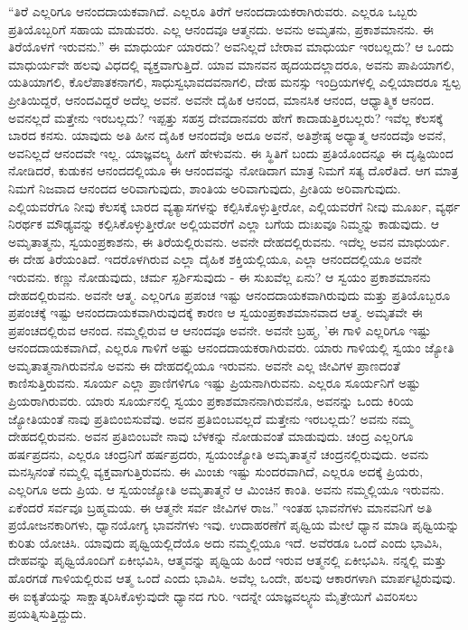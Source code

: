 “ತಿರೆ ಎಲ್ಲರಿಗೂ ಆನಂದದಾಯಕವಾಗಿದೆ. ಎಲ್ಲರೂ ತಿರೆಗೆ ಆನಂದದಾಯಕರಾಗಿರುವರು. ಎಲ್ಲರೂ ಒಬ್ಬರು ಪ್ರತಿಯೊಬ್ಬರಿಗೆ ಸಹಾಯ ಮಾಡುವರು. ಎಲ್ಲ ಆನಂದವೂ ಆತ್ಮನದು. ಅವನು ಅಮೃತನು, ಪ್ರಕಾಶಮಾನನು. ಈ ತಿರೆಯೊಳಗೆ ಇರುವನು.” ಈ ಮಾಧುರ್ಯ ಯಾರದು? ಅವನಿಲ್ಲದೆ ಬೇರಾವ ಮಾಧುರ್ಯ ಇರಬಲ್ಲದು? ಆ ಒಂದು ಮಾಧುರ್ಯವೇ ಹಲವು ವಿಧದಲ್ಲಿ ವ್ಯಕ್ತವಾಗುತ್ತಿದೆ. ಯಾವ ಮಾನವನ ಹೃದಯದಲ್ಲಾದರೂ, ಅವನು ಪಾಪಿಯಾಗಲಿ, ಯತಿಯಾಗಲಿ, ಕೊಲೆಪಾತಕನಾಗಲಿ, ಸಾಧುಸ್ವಭಾವದವನಾಗಲಿ, ದೇಹ ಮನಸ್ಸು ಇಂದ್ರಿಯಗಳಲ್ಲಿ ಎಲ್ಲಿಯಾದರೂ ಸ್ವಲ್ಪ ಪ್ರೀತಿಯಿದ್ದರೆ, ಆನಂದವಿದ್ದರೆ ಅದೆಲ್ಲ ಅವನೆ. ಅವನೇ ದೈಹಿಕ ಆನಂದ, ಮಾನಸಿಕ ಆನಂದ, ಆಧ್ಯಾತ್ಮಿಕ ಆನಂದ. ಅವನಲ್ಲದೆ ಮತ್ತೇನು ಇರಬಲ್ಲದು? ಇಪ್ಪತ್ತು ಸಹಸ್ರ ದೇವದಾನವರು ಹೇಗೆ ಕಾದಾಡುತ್ತಿರಬಲ್ಲರು? ಇವೆಲ್ಲ ಕೆಲಸಕ್ಕೆ ಬಾರದ ಕನಸು. ಯಾವುದು ಅತಿ ಹೀನ ದೈಹಿಕ ಆನಂದವೊ ಅದೂ ಅವನೆ, ಅತಿಶ್ರೇಷ್ಠ ಅಧ್ಯಾತ್ಮ ಆನಂದವೊ ಅವನೆ, ಅವನಿಲ್ಲದೆ ಆನಂದವೇ ಇಲ್ಲ. ಯಾಜ್ಞವಲ್ಕ್ಯ ಹೀಗೆ ಹೇಳುವನು. ಈ ಸ್ಥಿತಿಗೆ ಬಂದು ಪ್ರತಿಯೊಂದನ್ನೂ ಈ ದೃಷ್ಟಿಯಿಂದ ನೋಡಿದರೆ, ಕುಡುಕನ ಆನಂದದಲ್ಲಿಯೂ ಈ ಆನಂದವನ್ನು ನೋಡಿದಾಗ ಮಾತ್ರ ನಿಮಗೆ ಸತ್ಯ ದೊರೆತಿದೆ. ಆಗ ಮಾತ್ರ ನಿಮಗೆ ನಿಜವಾದ ಆನಂದದ ಅರಿವಾಗುವುದು, ಶಾಂತಿಯ ಅರಿವಾಗುವುದು, ಪ್ರೀತಿಯ ಅರಿವಾಗುವುದು. ಎಲ್ಲಿಯವರೆಗೂ ನೀವು ಕೆಲಸಕ್ಕೆ ಬಾರದ ವ್ಯತ್ಯಾಸಗಳನ್ನು ಕಲ್ಪಿಸಿಕೊಳ್ಳುತ್ತೀರೋ, ಎಲ್ಲಿಯವರೆಗೆ ನೀವು ಮೂರ್ಖ, ವ್ಯರ್ಥ ನಿರರ್ಥಕ ಮೌಢ್ಯವನ್ನು ಕಲ್ಪಿಸಿಕೊಳ್ಳುತ್ತೀರೋ ಅಲ್ಲಿಯವರೆಗೆ ಎಲ್ಲಾ ಬಗೆಯ ದುಃಖವೂ ನಿಮ್ಮನ್ನು ಕಾಡುವುದು. ಆ ಅಮೃತಾತ್ಮನು, ಸ್ವಯಂಪ್ರಕಾಶನು, ಈ ತಿರೆಯಲ್ಲಿರುವನು. ಅವನೇ ದೇಹದಲ್ಲಿರುವನು. ಇದೆಲ್ಲ ಅವನ ಮಾಧುರ್ಯ. ಈ ದೇಹ ತಿರೆಯಂತಿದೆ. ಇದರೊಳಗಿರುವ ಎಲ್ಲಾ ದೈಹಿಕ ಶಕ್ತಿಯಲ್ಲಿಯೂ, ಎಲ್ಲಾ ಆನಂದದಲ್ಲಿಯೂ ಅವನೇ ಇರುವನು. ಕಣ್ಣು ನೋಡುವುದು, ಚರ್ಮ ಸ್ಪರ್ಶಿಸುವುದು - ಈ ಸುಖವೆಲ್ಲ ಏನು? ಆ ಸ್ವಯಂ ಪ್ರಕಾಶಮಾನನು ದೇಹದಲ್ಲಿರುವನು. ಅವನೇ ಆತ್ಮ. ಎಲ್ಲರಿಗೂ ಪ್ರಪಂಚ ಇಷ್ಟು ಆನಂದದಾಯಕವಾಗಿರುವುದು ಮತ್ತು ಪ್ರತಿಯೊಬ್ಬರೂ ಪ್ರಪಂಚಕ್ಕೆ ಇಷ್ಟು ಆನಂದದಾಯಕವಾಗಿರುವುದಕ್ಕೆ ಕಾರಣ ಆ ಸ್ವಯಂಪ್ರಕಾಶಮಾನವಾದ ಆತ್ಮ. ಅಮೃತವೇ ಈ ಪ್ರಪಂಚದಲ್ಲಿರುವ ಆನಂದ. ನಮ್ಮಲ್ಲಿರುವ ಆ ಆನಂದವೂ ಅವನೇ. ಅವನೇ ಬ್ರಹ್ಮ, 'ಈ ಗಾಳಿ ಎಲ್ಲರಿಗೂ ಇಷ್ಟು ಆನಂದದಾಯಕವಾಗಿದೆ, ಎಲ್ಲರೂ ಗಾಳಿಗೆ ಅಷ್ಟು ಆನಂದದಾಯಕರಾಗಿರುವರು. ಯಾರು ಗಾಳಿಯಲ್ಲಿ ಸ್ವಯಂ ಜ್ಯೋತಿ ಅಮೃತಾತ್ಮನಾಗಿರುವನೊ ಅವನು ಈ ದೇಹದಲ್ಲಿಯೂ ಇರುವನು. ಅವನೇ ಎಲ್ಲ ಜೀವಿಗಳ ಪ್ರಾಣದಂತೆ ಕಾಣಿಸುತ್ತಿರುವನು. ಸೂರ್ಯ ಎಲ್ಲಾ ಪ್ರಾಣಿಗಳಿಗೂ ಇಷ್ಟು ಪ್ರಿಯನಾಗಿರುವನು. ಎಲ್ಲರೂ ಸೂರ್ಯನಿಗೆ ಅಷ್ಟು ಪ್ರಿಯರಾಗಿರುವರು. ಯಾರು ಸೂರ್ಯನಲ್ಲಿ ಸ್ವಯಂ ಪ್ರಕಾಶಮಾನನಾಗಿರುವನೊ, ಅವನನ್ನು ಒಂದು ಕಿರಿಯ ಜ್ಯೋತಿಯಂತೆ ನಾವು ಪ್ರತಿಬಿಂಬಿಸುವೆವು. ಅವನ ಪ್ರತಿಬಿಂಬವಲ್ಲದೆ ಮತ್ತೇನು ಇರಬಲ್ಲದು? ಅವನು ನಮ್ಮ ದೇಹದಲ್ಲಿರುವನು. ಅವನ ಪ್ರತಿಬಿಂಬವೇ ನಾವು ಬೆಳಕನ್ನು ನೋಡುವಂತೆ ಮಾಡುವುದು. ಚಂದ್ರ ಎಲ್ಲರಿಗೂ ಹರ್ಷಪ್ರದನು, ಎಲ್ಲರೂ ಚಂದ್ರನಿಗೆ ಹರ್ಷಪ್ರದರು, ಸ್ವಯಂಜ್ಯೋತಿ ಅಮೃತಾತ್ಮನೆ ಚಂದ್ರನಲ್ಲಿರುವುದು. ಅವನು ಮನಸ್ಸಿನಂತೆ ನಮ್ಮಲ್ಲಿ ವ್ಯಕ್ತವಾಗುತ್ತಿರುವನು. ಈ ಮಿಂಚು ಇಷ್ಟು ಸುಂದರವಾಗಿದೆ, ಎಲ್ಲರೂ ಅದಕ್ಕೆ ಪ್ರಿಯರು, ಎಲ್ಲರಿಗೂ ಅದು ಪ್ರಿಯ. ಆ ಸ್ವಯಂಜ್ಯೋತಿ ಅಮೃತಾತ್ಮನೆ ಆ ಮಿಂಚಿನ ಕಾಂತಿ. ಅವನು ನಮ್ಮಲ್ಲಿಯೂ ಇರುವನು. ಏಕೆಂದರೆ ಸರ್ವವೂ ಬ್ರಹ್ಮಮಯ. ಈ ಆತ್ಮನೇ ಸರ್ವ ಜೀವಿಗಳ ರಾಜ.” ಇಂತಹ ಭಾವನೆಗಳು ಮಾನವನಿಗೆ ಅತಿ ಪ್ರಯೋಜನಕಾರಿಗಳು, ಧ್ಯಾನಯೋಗ್ಯ ಭಾವನೆಗಳು ಇವು. ಉದಾಹರಣೆಗೆ ಪೃಥ್ವಿಯ ಮೇಲೆ ಧ್ಯಾನ ಮಾಡಿ ಪೃಥ್ವಿಯನ್ನು ಕುರಿತು ಯೋಚಿಸಿ. ಯಾವುದು ಪೃಥ್ವಿಯಲ್ಲಿದೆಯೊ ಅದು ನಮ್ಮಲ್ಲಿಯೂ ಇದೆ. ಅವೆರಡೂ ಒಂದೆ ಎಂದು ಭಾವಿಸಿ, ದೇಹವನ್ನು ಪೃಥ್ವಿಯೊಂದಿಗೆ ಏಕೀಭವಿಸಿ, ಆತ್ಮವನ್ನು ಪೃಥ್ವಿಯ ಹಿಂದೆ ಇರುವ ಆತ್ಮನಲ್ಲಿ ಏಕೀಭವಿಸಿ. ನನ್ನಲ್ಲಿ ಮತ್ತು ಹೊರಗಡೆ ಗಾಳಿಯಲ್ಲಿರುವ ಆತ್ಮ ಒಂದೆ ಎಂದು ಭಾವಿಸಿ. ಅವೆಲ್ಲ ಒಂದೇ, ಹಲವು ಆಕಾರಗಳಾಗಿ ಮಾರ್ಪಟ್ಟಿರುವುವು. ಈ ಐಕ್ಯತೆಯನ್ನು ಸಾಕ್ಷಾತ್ಕರಿಸಿಕೊಳ್ಳುವುದೇ ಧ್ಯಾನದ ಗುರಿ. ಇದನ್ನೇ ಯಾಜ್ಞವಲ್ಕ್ಯನು ಮೈತ್ರೇಯಿಗೆ ವಿವರಿಸಲು ಪ್ರಯತ್ನಿಸುತ್ತಿದ್ದುದು.

